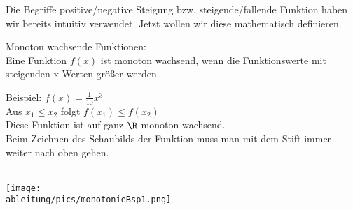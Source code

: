Die Begriffe positive/negative Steigung bzw. steigende/fallende Funktion haben wir bereits intuitiv verwendet. Jetzt wollen wir diese mathematisch definieren.
\begin{tcolorbox}
	Monoton wachsende Funktionen:\\
	\textcolor{loestc}{Eine Funktion \(f(x)\) ist monoton wachsend, wenn die Funktionswerte mit steigenden x-Werten größer werden.\\
	}
\end{tcolorbox}
\begin{minipage}{\textwidth}
	\begin{minipage}{0.6\textwidth}
		Beispiel: \(f(x)=\frac{1}{10}x^3\)\\
		\textcolor{loes}{Aus \(x_1\leq x_2\) folgt \(f(x_1 )\leq f(x_2)\)\\
			Diese Funktion ist auf ganz \(\R\) monoton wachsend.\\
			Beim Zeichnen des Schaubilds der Funktion muss man mit dem Stift immer weiter nach oben gehen.}\\ \\
	\end{minipage}
	\begin{minipage}{0.39\textwidth}
		\centering\texttt{[image: \\ableitung/pics/monotonieBsp1.png]}\\
	\end{minipage}
\end{minipage}\\

